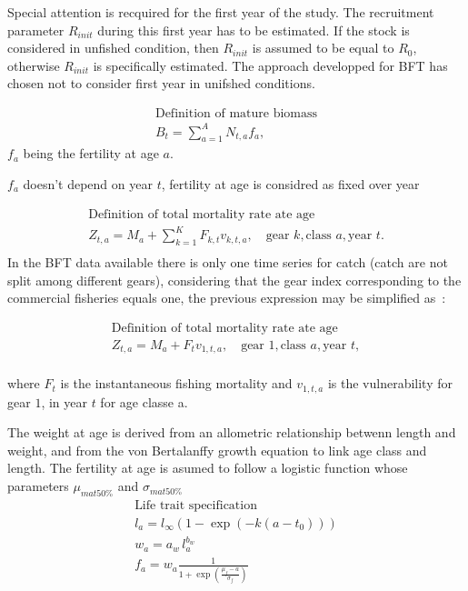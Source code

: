 Special attention is recquired for the first year of the study. The recruitment parameter $R_{init}$ during this first year has to be estimated.
If the stock is considered in unfished condition, then $R_{init}$ is assumed to be equal to $R_0$, otherwise $R_{init}$ is specifically estimated. 
The approach developped for BFT has chosen not to consider first year in unifshed conditions.

\begin{gather}
\mbox{Definition of mature biomass}\\
B_t= \sum_{a=1}^A N_{t,a} f_a,
\end{gather} 
$f_a$ being the fertility at age $a$. 

$f_a$ doesn't depend  on year $t$, fertility at  age is considred
  as fixed over year

  
  
\begin{gather}
  \mbox{Definition of total mortality rate ate age}\\
  Z_{t,a}= M_a + \sum_{k=1}^K F_{k,t} v_{k, t,a}, \quad \mbox{gear }k,
  \mbox{class }a, \mbox{year }t.   \\
\end{gather} 
In  the  BFT  data  available  there is  only  one  time  series  for
 catch (catch are  not split among different  gears), considering that
 the gear index corresponding to the 
commercial fisheries equals one, the previous expression may be simplified as~:

\begin{gather}
  \mbox{Definition of total mortality rate ate age}\\
  Z_{t,a}= M_a + F_t v_{1, t,a}, \quad \mbox{gear } 1,
  \mbox{class }a, \mbox{year }t,   \\
\end{gather} 

where $F_t$ is the instantaneous  fishing mortality and $v_{1,t,a}$ is
the vulnerability for gear $1$, in year $t$ for age classe a.

The weight at age is derived from an allometric relationship betwenn length and weight, and from the von Bertalanffy growth equation to link age class and length.
The fertility at age is asumed to follow a logistic function whose parameters $\mu_{mat 50\%}$ and $\sigma_{mat 50\%}$ 
\begin{gather}
  \mbox{Life trait specification}\\
l_a = l_\infty \left( 1- \exp{\left(-k\left( a - t_0\right)\right)}\right) \\
w_a = a_w\, l_a^{b_w} \\
f_a = w_a \frac{1}{1+\exp{ \left(\frac{\mu_f - a}{\sigma_f}\right)}}\\
  \end{gather}
  


